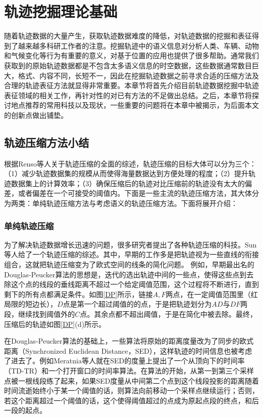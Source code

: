 
\chapter{轨迹挖掘理论基础}
\label{chapter:rw}

随着轨迹数据的大量产生，获取轨迹数据难度的降低，对轨迹数据的挖掘和表征得到了越来越多科研工作者的注意。挖掘轨迹中的语义信息对分析人类、车辆、动物和气候变化等行为有重要的意义，对基于位置的应用也提供了很多帮助。通常我们获取到的原始轨迹数据都是不包含太多语义信息的时空数据，这些数据通常数目巨大，格式、内容不同，长短不一，因此在挖掘轨迹数据之前寻求合适的压缩方法及合理的轨迹表征方法就显得非常重要。本章节将首先介绍目前轨迹数据挖掘中轨迹表征领域的相关工作，再针对性的对已有方法的不足做出总结。之后，本章节将探讨地点推荐的常用科技以及现状，一些重要的问题将在本章中被揭示，为后面本文的创新点做出铺垫。



\section{轨迹压缩方法小结}
根据Renso等人关于轨迹压缩的全面的综述，轨迹压缩的目标大体可以分为三个：（1）减少轨迹数据集的规模从而使得海量数据达到方便处理的程度；（2）提升轨迹数据集上的计算效率；（3）确保压缩后的轨迹对比压缩前的轨迹没有太大的偏差，或者偏差在一个可接受的阈值内。下面是一些主流的轨迹压缩方法，其大体分为两类：单纯轨迹压缩方法与考虑语义的轨迹压缩方法。下面将展开介绍：

\subsection{单纯轨迹压缩}
为了解决轨迹数据增长迅速的问题，很多研究者提出了各种轨迹压缩的科技。Sun等人给了一个轨迹压缩的综述。其中，早期的工作多是把轨迹视为一些直线的衔接组合，这就把轨迹压缩变为了欧式空间的线条的简化问题。 例如，早期最出名的Douglas-Peucker算法的思想是，迭代的选出轨迹中间的一些点，使得这些点到去除这个点的线段的垂线距离不超过一个给定阈值范围，这个过程将不断进行，直到剩下的所有点都满足条件。如图\ref{DP}所示，链接$A,F$两点，在一定阈值范围里（红局限的短边长），$D$点是第一个超过阈值的的点，于是把轨迹划分为$AD$与$DF$两段，继续找到阈值外的$C$点。其余点都不超出阈值，于是在简化中被去除。最终，压缩后的轨迹如图\ref{DP}(d)所示。


在Douglas-Peucker算法的基础上，一些算法将原始的距离度量改为了同步的欧式距离（Synchronized Euclidean Distance，SED），这样轨迹的时间信息也被考虑了进去了。例如Meratnia等人就在SED的度量上提出了一个从顶向下的时间率（TD-TR）和一个打开窗口的时间率算法。在算法的开始，从第一到第三个采样点被一根线段练了起来，如果SED度量从中间第二个点到这个线段投影的距离随着时间流逝始终小于某一个阈值的话，则算法向前移动一个采样点继续运行；否则，若这个距离超过一个阈值的话，这个使得阈值超过的点成为原起点段的终点，和后一段的起点。

